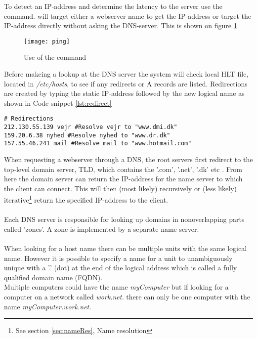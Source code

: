 \documentclass[Preamble]{subfiles}
\begin{document}
To detect an IP-address and determine the latency to the server use the  command.
 will target either a webserver name to get the IP-address or target the IP-address directly without asking the DNS-server.
This is shown on figure \ref{fig:ping}


\begin{figure}[H]
\centering
\texttt{[image: ping]}
\caption{Use of the command }
\label{fig:ping}
\end{figure}


Before makeing a lookup at the DNS server the system will check local HLT file, located in  \textit{/etc/hosts}, to see if any redirects or A records are listed.
Redirections are created by typing the static IP-address followed by the new logical name as shown in Code snippet \ref{lst:redirect}


\begin{lstlisting}[caption={Hosts file redirection}, style=Code-Bash, label=lst:redirect]
# Redirections
212.130.55.139 vejr #Resolve vejr to "www.dmi.dk"
159.20.6.38 nyhed #Resolve nyhed to "www.dr.dk"
157.55.46.241 mail #Resolve mail to "www.hotmail.com"
\end{lstlisting}

\vspace{10px}

When requesting a webserver through a DNS, the root servers first redirect to the top-level domain server, TLD, which contains the '.com', '.net', '.dk' etc \cite[p. 192]{Tanenbaum}.
From here the domain server can return the IP-address for the name server to which the client can connect. 
This will then (most likely) recursively or (less likely) iterative\footnote{See section \ref{sec:nameRes}, Name resolution} return the specified IP-address to the client.
\\
\\
Each DNS server is responsible for looking up domains in nonoverlapping parts called 'zones'. 
A zone is implemented by a separate name server\cite[p. 202-205]{Tanenbaum}.
\\
\\
When looking for a host name there can be multiple units with the same logical name. 
However it is possible to specify a name for a unit to unambiguously unique with a '.' (dot) at the end of the logical address which is called a fully qualified domain name (FQDN)\cite{wiki-fqdn}.
\\
Multiple computers could have the name \textit{myComputer} but if looking for a computer on a network called \textit{work.net.} there can only be one computer with the name \textit{myComputer.work.net.}
\end{document}
